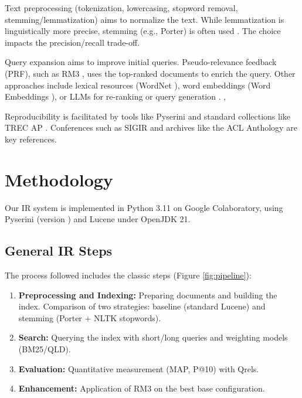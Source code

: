 \documentclass[11pt,a4paper]{article}
\begin{document}
Text preprocessing (tokenization, lowercasing, stopword removal, stemming/lemmatization) aims to normalize the text. While lemmatization is linguistically more precise, stemming (e.g., Porter) is often used \citep{Christopher2008Introduction}. The choice impacts the precision/recall trade-off. %

Query expansion aims to improve initial queries. Pseudo-relevance feedback (PRF), such as RM3 \citep{Naveen2004Umass}, uses the top-ranked documents to enrich the query. Other approaches include lexical resources (WordNet \citep{George2019Wordnet}), word embeddings (Word Embeddings \citep{Tomas2015Distributed}), or LLMs for re-ranking \citep{Nogueira2019BERTReRank} or query generation \citep{Guangyuan2024Query}. \citep{Devlin2021Bert}, \citep{Stanford2023Cs224n}

Reproducibility is facilitated by tools like Pyserini \citep{Lin2021Pyserini} and standard collections like TREC AP \citep{Donna1994Overview}. Conferences such as SIGIR \citep{ACM2018Acm} and archives like the ACL Anthology \citep{aclAnthologyWebsite} are key references.

\section{Methodology}
\label{sec:methodo}
Our IR system is implemented in Python 3.11 on Google Colaboratory, using Pyserini (version ) and Lucene under OpenJDK 21.

\subsection{General IR Steps}
The process followed includes the classic steps (Figure \ref{fig:pipeline}):
\begin{enumerate}
    \item \textbf{Preprocessing and Indexing:} Preparing documents and building the index. Comparison of two strategies: baseline (standard Lucene) and stemming (Porter + NLTK stopwords).
    \item \textbf{Search:} Querying the index with short/long queries and weighting models (BM25/QLD).
    \item \textbf{Evaluation:} Quantitative measurement (MAP, P@10) with Qrels.
    \item \textbf{Enhancement:} Application of RM3 on the best base configuration.
\end{enumerate}
\end{document}
